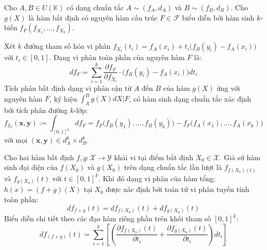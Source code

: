 \begin{theorem}
	Cho $A, B \in U(\mathbb{K})$ có dạng chuẩn tắc $A \sim (f_A, d_A)$ và $B \sim (f_B, d_B)$. Cho $g(X)$ là hàm bất định có nguyên hàm cấu trúc $F \in \mathcal{F}$ biểu diễn bởi hàm sinh $k$-biến $f_F(f_{X_1}, \dots, f_{X_k})$.
	
	Xét $k$ đường tham số hóa vi phân $f_{X_i}(t_i) = f_A(x_i) + t_i\big(f_B(y_i) - f_A(x_i)\big)$ với $t_i \in [0, 1]$. Dạng vi phân toàn phần của nguyên hàm $F$ là:
	\[
	d f_F = \sum_{i=1}^{k} \frac{\partial f_F}{\partial f_{X_i}} \cdot \big(f_B(y_i) - f_A(x_i)\big) dt_i
	\]
	Tích phân bất định dạng vi phân cận từ $A$ đến $B$ của hàm $g(X)$ ứng với nguyên hàm $F$, ký hiệu $\int_A^B g(X)dX \Big| F$, có hàm sinh dạng chuẩn tắc xác định bởi tích phân đường $k$-lớp:
	\[
	f_{I_F}(\mathbf{x}, \mathbf{y}) := \int_{[0, 1]^k} d f_F = f_F\big(f_B(y_1), \dots, f_B(y_k)\big) - f_F\big(f_A(x_1), \dots, f_A(x_k)\big)
	\]
	với mọi $(\mathbf{x}, \mathbf{y}) \in d_A^k \times d_B^k$.
\end{theorem}

\begin{theorem}
	Cho hai hàm bất định $f,g : \mathcal{X} \to \mathcal{Y}$ khải vi tại điểm bất định $X_0 \in \mathcal{X}$. Giả sử hàm sinh đại diện của $f(X_0)$ và $g(X_0)$ trên dạng chuẩn tắc lần lượt là $f_{f(X_0)(t)}$ và $f_{g(X_0)}(t)$ với $ t \in [0,1]^k$.
	\newline
	Khi đó dạng vi phân của hàm tổng:
	$h(x) = (f+g)(X)$ tại $X_0$ được xác định bởi toán tử vi phân tuyến tính toàn phần:
	\[df_{f+g}(t) = df_{f(X_0)}(t) + df_{g(X_0)}(t)\]
	Biểu diễn chi tiết theo các đạo hàm riêng phần trên khối tham số $[0,1]^k:$
	\[df_{\left(f+g\right)}(t) = \sum_{i=1}^{k}\left[ \left(\frac{\partial f_{f(X_0)}(t)}{\partial t_i} + \frac{\partial f_{g(X_0)}(t)}{\partial t_i}\right) dt_i\right]\]
\end{theorem}